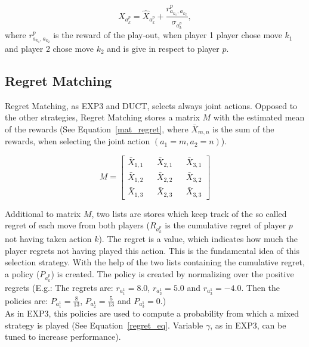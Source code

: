 \documentclass{article}
\begin{document}
\begin{equation}\label{exp3_update}
\hat{X}_{a^{p}_{k}} = \hat{X}_{a^{p}_{k}} + \frac{r^{p}_{a_{k_{1}},a_{k_{2}}}}{\sigma_{a^{p}_{k}}},
\end{equation}
where $r^{p}_{a_{k_{1}},a_{k_{2}}}$ is the reward of the play-out, when player 1 player chose move $k_{1}$ and player 2 chose move $k_{2}$ and is give in respect to player $p$.

\subsection{Regret Matching}
\label{subsec:rm}
Regret Matching, as EXP3 and DUCT, selects always joint actions. Opposed to the other strategies, Regret Matching stores a matrix $M$ with the estimated mean of the rewards (See Equation~\ref{mat_regret}, where $\bar{X}_{m,n}$ is the sum of the rewards, when selecting the joint action $(a_{1}=m,a_{2}=n)$).

\begin{equation}\label{mat_regret}
M = 
\begin{bmatrix}

\bar{X}_{1,1} && \bar{X}_{2,1} && \bar{X}_{3,1} \\
\bar{X}_{1,2} && \bar{X}_{2,2} && \bar{X}_{3,2} \\
\bar{X}_{1,3} && \bar{X}_{2,3} && \bar{X}_{3,3}

\end{bmatrix}
\end{equation}

Additional to matrix $M$, two lists are stores which keep track of the so called regret of each move from both players ($R_{a^{p}_{k}}$ is the cumulative regret of player $p$ not having taken action $k$). The regret is a value, which indicates how much the player regrets not having played this action. This is the fundamental idea of this selection strategy. With the help of the two lists containing the cumulative regret, a policy ($P_{a^{p}_{k}}$) is created. The policy is created by normalizing over the positive regrets (E.g.: The regrets are: $r_{a^{1}_{1}} = 8.0$, $r_{a^{1}_{2}} = 5.0$ and $r_{a^{1}_{3}} = -4.0$. Then the policies are: $P_{a^{1}_{1}} = \frac{8}{13}$, $P_{a^{1}_{2}} = \frac{5}{13}$ and $P_{a^{1}_{3}} = 0$.)\\
As in EXP3, this policies are used to compute a probability from which a mixed strategy is played (See Equation~\ref{regret_eq}. Variable $\gamma$, as in EXP3, can be tuned to increase performance).
\end{document}
